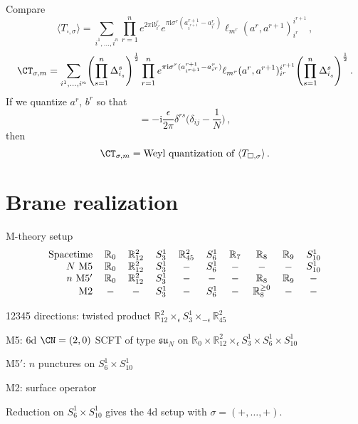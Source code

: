 \documentclass[t]{beamer}
\newcommand{\vev}[1]{\langle #1 \rangle}
\newcommand{\suf}{\mathfrak{su}}
\newcommand{\R}{\mathbb{R}}
\let\eps\epsilon
\newcommand{\iu}{\mathrm{i}}
\begin{document}
\begin{frame}
  Compare
  \begin{equation*}
    \vev{T_{\square, \sigma}}
    =
    \sum_{i^1, \dotsc, i^n}
    \prod_{r=1}^n
    e^{2\pi\iu b^r_{i^r}}
    e^{\pi\iu\sigma^r (a^{r+1}_{i^{r+1}} - a^r_{i^r})}
    \ell_{m^r}(a^r, a^{r+1})_{i^r}^{i^{r+1}} \,,
  \end{equation*}
  \begin{equation*}
    \CT_{\sigma,m}
    =
    \sum_{i^1, \dotsc, i^n}
    \Biggl(\prod_{s=1}^n \Delta^s_{i_s}\Biggr)^{\frac12}
    \prod_{r=1}^n
    e^{\pi\iu\sigma^r (a^{r+1}_{i^{r+1}} - a^r_{i^r})}
    \ell_{m^r}(a^r, a^{r+1})_{i^r}^{i^{r+1}}
    \Biggl(\prod_{s=1}^n \Delta^s_{i_s}\Biggr)^{\frac12}
    \,.
  \end{equation*}
  If we quantize $a^r$, $b^r$ so that
  \begin{equation*}
    [\ah^r_i, \bh^s_j]
    = -\iu \frac{\eps}{2\pi} \delta^{rs} \biggl(\delta_{ij} - \frac1N\biggr) \,,
  \end{equation*}
  then
  \begin{equation*}
    \CT_{\sigma,m}
    = \text{Weyl quantization of $\vev{T_{\square, \sigma}}$} \,.
  \end{equation*}
\end{frame}



\section*{Brane realization}

\begin{frame}
  M-theory setup
  \begin{equation*}
    \begin{tabular}{rcccccccccc}
      Spacetime & $\R_0$ & $\R^2_{12}$ & $S^1_3$ & $\R^2_{45}$ & $S^1_6$
      & $\R_7$ & $\R_8$ & $\R_9$ & $S^1_{10}$
      \\
      $N$ M5 & $\R_0$ & $\R^2_{12}$ & $S^1_3$ & $-$ & $S^1_6$
      & $-$ & $-$ & $-$ & $S^1_{10}$
     \\
      $n$ M5$'$ & $\R_0$ & $\R^2_{12}$ & $S^1_3$ & $-$
      & $-$ & $-$ & $\R_8$ & $\R_9$ & $-$
     \\
      M2 & $-$ & $-$ & $S^1_3$ & $-$ & $S^1_6$
      & $-$ & $\R^{\geq 0}_8$ & $-$ & $-$
    \end{tabular}
  \end{equation*}

  12345 directions: twisted product
  $\R^2_{12} \times_\eps S^1_3 \times_{-\eps} \R^2_{45}$

  M5: 6d $\CN = (2,0)$ SCFT of type $\suf_N$ on
  $\R_0 \times \R^2_{12} \times_\eps S^1_3 \times S^1_6 \times
  S^1_{10}$

  M5$'$: $n$ punctures on $S^1_6 \times S^1_{10}$

  M2: surface operator

  Reduction on $S^1_6 \times S^1_{10}$ gives the 4d setup with
  $\sigma = (+,\dotsc,+)$.
\end{frame}
\end{document}
